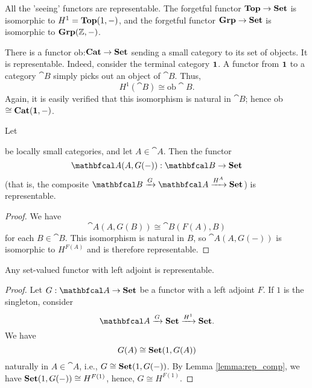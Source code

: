 \documentclass[11pt,a4paper]{article}
\begin{document}
\begin{example}
All the 'seeing' functors are representable. The forgetful functor $\mathbf{Top}\to\mathbf{Set}$ is isomorphic to $H^1=\mathbf{Top}(1,-)$, and the forgetful functor $\mathbf{Grp}\to\mathbf{Set}$ is isomorphic to $\mathbf{Grp}(\mathbb{Z},-)$.
\end{example}

\begin{example}
    There is a functor ob:$\mathbf{Cat}\to\mathbf{Set}$ sending a small category to its set of objects. It is representable. Indeed, consider the terminal category $\mathbf{1}$. A functor from $\mathbf{1}$ to a category $\cat{B}$ simply picks out an object of $\cat{B}$. Thus,
    \begin{equation*}
        H^1(\cat{B})\cong\text{ob}\cat{B}.
    \end{equation*}
    Again, it is easily verified that this isomorphism is natural in $\cat{B}$; hence ob$\cong\mathbf{Cat}(\mathbf{1},-)$.
\end{example}

\begin{lemma}\label{lemma:rep_comp}
    Let  be locally small categories, and let $A\in\cat{A}$. Then the functor
    \begin{equation*}
        \cat{A}(A,G(-)): \cat{B}\to\bcat{Set}
    \end{equation*}
    (that is, the composite $\cat{B} \xrightarrow{G} \cat{A} \xrightarrow{H^A} \bcat{Set}$) is representable.
\end{lemma}
\begin{proof}
    We have
    \begin{equation*}
        \cat{A}(A,G(B))\cong \cat{B}(F(A),B)
    \end{equation*}
    for each $B\in\cat{B}$. This isomorphism is natural in $B$, so $\cat{A}(A,G(-))$ is isomorphic to $H^{F(A)}$ and is therefore representable.
\end{proof}

\begin{proposition}
    Any set-valued functor with left adjoint is representable.
\end{proposition}
\begin{proof}
    Let $G:\cat{A}\to\bcat{Set}$ be a functor with a left adjoint $F$. If $1$ is the singleton, consider
    \begin{equation*}
        \cat{A}\xrightarrow{G}\bcat{Set}\xrightarrow{H^1}\bcat{Set}.
    \end{equation*}
    We have
    \begin{equation*}
        G(A)\cong\mathbf{Set}(1,G(A))
    \end{equation*}
    naturally in $A\in\cat{A}$, i.e., $G\cong \mathbf{Set}(1,G(-))$. By Lemma \ref{lemma:rep_comp}, we have $\mathbf{Set}(1,G(-))\cong H^{F(1)}$, hence, $G\cong H^{F(1)}$.
\end{proof}
\end{document}
